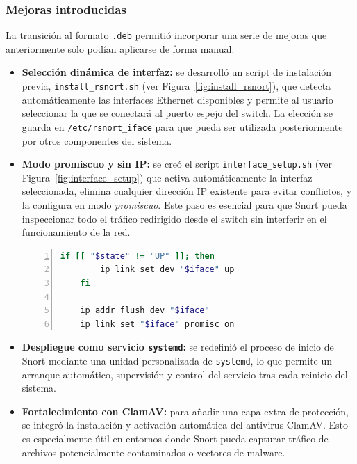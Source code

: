 \documentclass[12pt,a4paper]{report}
\begin{document}
\subsubsection{Mejoras introducidas}

La transición al formato \texttt{.deb} permitió incorporar una serie de mejoras que anteriormente solo podían aplicarse de forma manual:

\begin{itemize}
	\item \textbf{Selección dinámica de interfaz:} se desarrolló un script de instalación previa, \texttt{install\_rsnort.sh} (ver Figura~\ref{fig:install_rsnort}), que detecta automáticamente las interfaces Ethernet disponibles y permite al usuario seleccionar la que se conectará al puerto espejo del switch. La elección se guarda en \texttt{/etc/rsnort\_iface} para que pueda ser utilizada posteriormente por otros componentes del sistema.
	
	\item \textbf{Modo promiscuo y sin IP:} se creó el script \texttt{interface\_setup.sh} (ver Figura~\ref{fig:interface_setup}) que activa automáticamente la interfaz seleccionada, elimina cualquier dirección IP existente para evitar conflictos, y la configura en modo \textit{promiscuo}. Este paso es esencial para que Snort pueda inspeccionar todo el tráfico redirigido desde el switch sin interferir en el funcionamiento de la red.
	
	\begin{lstlisting}[language=bash, caption={Activación automática del modo promiscuo en interface\_setup.sh}, label=lst:promiscuo, basicstyle=\ttfamily\footnotesize, frame=single, numbers=left, numberstyle=\tiny, breaklines=true]
	if [[ "$state" != "UP" ]]; then
		ip link set dev "$iface" up
	fi
	
	ip addr flush dev "$iface"
	ip link set "$iface" promisc on
	\end{lstlisting}
	
	\item \textbf{Despliegue como servicio \texttt{systemd}:} se redefinió el proceso de inicio de Snort mediante una unidad personalizada de \texttt{systemd}, lo que permite un arranque automático, supervisión y control del servicio tras cada reinicio del sistema.
	
	\item \textbf{Fortalecimiento con ClamAV:} para añadir una capa extra de protección, se integró la instalación y activación automática del antivirus ClamAV. Esto es especialmente útil en entornos donde Snort pueda capturar tráfico de archivos potencialmente contaminados o vectores de malware.
\end{itemize}
\end{document}
